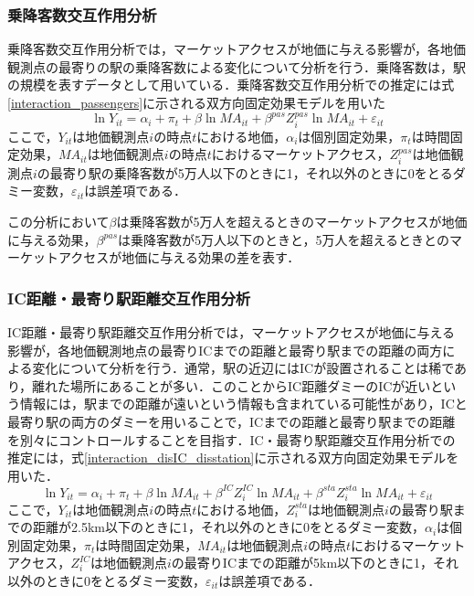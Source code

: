 \subsubsection{乗降客数交互作用分析}
乗降客数交互作用分析では，マーケットアクセスが地価に与える影響が，各地価観測点の最寄りの駅の乗降客数による変化について分析を行う．乗降客数は，駅の規模を表すデータとして用いている．乗降客数交互作用分析での推定には式\ref{interaction_passengers}に示される双方向固定効果モデルを用いた
\begin{equation}
  \ln{Y_{it}} = \alpha_{i} + \pi_{t} + \beta\ln{MA_{it}} + \beta^{pas}Z^{pas}_{i}\ln{MA_{it}} + \varepsilon_{it}
  \label{interaction_passengers}
\end{equation}
ここで，$Y_{it}$は地価観測点$i$の時点$t$における地価，$\alpha_{i}$は個別固定効果，$\pi_{t}$は時間固定効果，$MA_{it}$は地価観測点$i$の時点$t$におけるマーケットアクセス，$Z^{pas}_{i}$は地価観測点$i$の最寄り駅の乗降客数が5万人以下のときに1，それ以外のときに0をとるダミー変数，$\varepsilon_{it}$は誤差項である．

この分析において$\beta$は乗降客数が5万人を超えるときのマーケットアクセスが地価に与える効果，$\beta^{pas}$は乗降客数が5万人以下のときと，5万人を超えるときとのマーケットアクセスが地価に与える効果の差を表す．
\subsubsection{IC距離・最寄り駅距離交互作用分析}
IC距離・最寄り駅距離交互作用分析では，マーケットアクセスが地価に与える影響が，各地価観測地点の最寄りICまでの距離と最寄り駅までの距離の両方による変化について分析を行う．通常，駅の近辺にはICが設置されることは稀であり，離れた場所にあることが多い．このことからIC距離ダミーのICが近いという情報には，駅までの距離が遠いという情報も含まれている可能性があり，ICと最寄り駅の両方のダミーを用いることで，ICまでの距離と最寄り駅までの距離を別々にコントロールすることを目指す．IC・最寄り駅距離交互作用分析での推定には，式\ref{interaction_disIC_disstation}に示される双方向固定効果モデルを用いた．
\begin{equation}
  \ln{Y_{it}} = \alpha_{i} + \pi_{t} + \beta\ln{MA_{it}} + \beta^{IC}Z^{IC}_{i}\ln{MA_{it}} + \beta^{sta}Z^{sta}_{i}\ln{MA_{it}} + \varepsilon_{it}
  \label{interaction_disIC_disstation}
\end{equation}
ここで，$Y_{it}$は地価観測点$i$の時点$t$における地価，$Z^{sta}_{i}$は地価観測点$i$の最寄り駅までの距離が2.5km以下のときに1，それ以外のときに0をとるダミー変数，$\alpha_{i}$は個別固定効果，$\pi_{t}$は時間固定効果，$MA_{it}$は地価観測点$i$の時点$t$におけるマーケットアクセス，$Z^{IC}_{i}$は地価観測点$i$の最寄りICまでの距離が5km以下のときに1，それ以外のときに0をとるダミー変数，$\varepsilon_{it}$は誤差項である．

